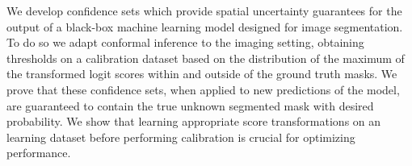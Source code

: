 We develop confidence sets which provide spatial uncertainty guarantees for the output of a black-box machine learning model designed for image segmentation. To do so we adapt conformal inference to the imaging setting, obtaining thresholds on a calibration dataset based on the distribution of the maximum of the transformed logit scores within and outside of the ground truth masks. We prove that these confidence sets, when applied to new predictions of the model, are guaranteed to contain the true unknown segmented mask with desired probability. We show that learning appropriate score transformations on an  learning dataset before performing calibration is crucial for optimizing performance.  